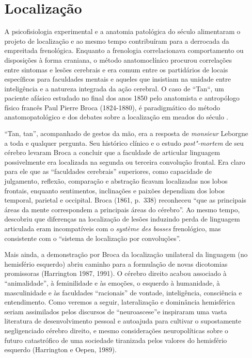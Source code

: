 \section{Localização}

A psicofisiologia experimental e a anatomia patológica do século 
alimentaram o projeto de localização e ao mesmo tempo contribuíram para
a derrocada da empreitada frenológica. Enquanto a frenologia
correlacionava comportamento ou disposições à forma craniana, o método
anatomoclínico procurou correlações entre sintomas e lesões cerebrais e
era comum entre os partidários de locais específicos para faculdades
mentais e aqueles que insistiam na unidade entre inteligência e a
natureza integrada da ação cerebral. O caso de ``Tan``, um paciente
afásico estudado no final dos anos 1850 pelo anatomista e antropólogo
físico francês Paul Pierre Broca (1824-1880), é paradigmático do método
anatomopatológico e dos debates sobre a localização em meados do século
.

``Tan, tan'', acompanhado de gestos da mão, era a resposta de
\emph{monsieur} Leborgne a toda e qualquer pergunta. Seu histórico
clínico e o estudo \emph{post"-mortem} de seu cérebro levaram Broca a
concluir que a faculdade de articular linguagem possivelmente era
localizada na segunda ou terceira convolução frontal. Era claro para ele
que as ``faculdades cerebrais'' superiores, como capacidade de
julgamento, reflexão, comparação e abstração ficavam localizadas nos
lobos frontais, enquanto sentimentos, inclinações e paixões dependiam
dos lobos temporal, parietal e occipital. Broca (1861, p.~338) reconheceu
``que as principais áreas da mente correspondem a principais áreas do
cérebro''. Ao mesmo tempo, descobriu que diferenças na localização de
lesões induzindo perda de linguagem articulada eram incompatíveis com o
\emph{système des bosses} frenológico, mas consistente com o ``sistema
de localização por convoluções''.

Mais ainda, a demonstração por Broca da localização unilateral da
linguagem (no hemisfério esquerdo) abriu caminho para a formulação de
novas dicotomias promissoras (Harrington 1987, 1991). O cérebro direito
acabou associado à ``animalidade'', à feminilidade e às emoções, o
esquerdo à humanidade, à masculinidade e às faculdades ``racionais'' de
vontade, inteligência, consciência e entendimento. Como veremos a
seguir, lateralização e dominância hemisférica seriam assimilados pelos
discursos de ``neuroascese''e inspiraram uma vasta literatura de
desenvolvimento pessoal e autoajuda para cultivar o supostamente
negligenciado cérebro direito, e mesmo considerações neuropolíticas
sobre o futuro catastrófico de uma sociedade tiranizada pelos valores do
hemisfério esquerdo (Harrington e Oepen, 1989).

